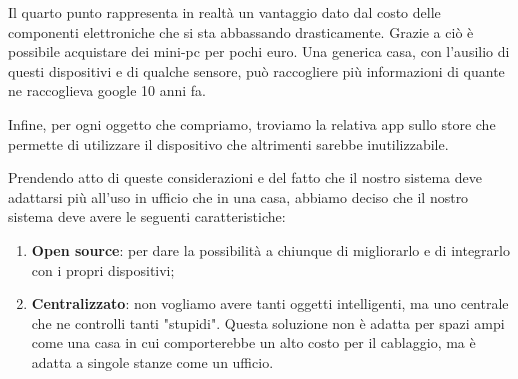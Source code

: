 Il quarto punto rappresenta in realtà un vantaggio dato dal costo delle componenti elettroniche che si sta abbassando drasticamente.
Grazie a ciò è possibile acquistare dei mini-pc per pochi euro. 
Una generica casa, con l'ausilio di questi dispositivi e di qualche sensore, può raccogliere più informazioni di quante ne raccoglieva google 10 anni fa.

Infine, per ogni oggetto che compriamo, troviamo la relativa app sullo store che permette di utilizzare il dispositivo che altrimenti sarebbe inutilizzabile.

Prendendo atto di queste considerazioni e del fatto che il nostro sistema deve adattarsi più all'uso in ufficio che in una casa, abbiamo deciso che il nostro sistema deve avere le seguenti caratteristiche:
\begin{enumerate}
\item \textbf{Open source}: per dare la possibilità a chiunque di migliorarlo e di integrarlo con i propri dispositivi;
\item \textbf{Centralizzato}: non vogliamo avere tanti oggetti intelligenti,
ma uno centrale che ne controlli tanti "stupidi". Questa soluzione non è adatta per spazi ampi come una casa in cui comporterebbe un alto costo per il cablaggio, ma è adatta a singole stanze come un ufficio. 
\end{enumerate} 

